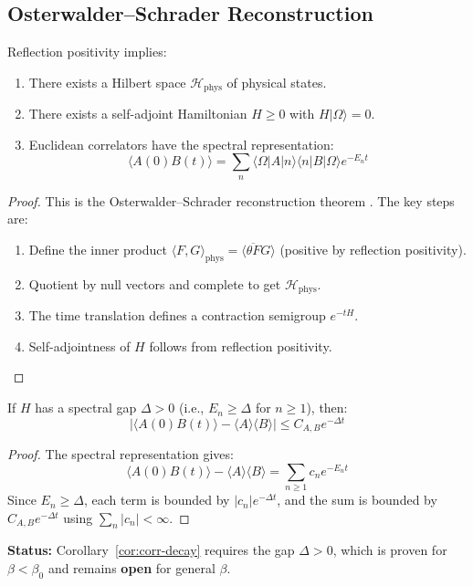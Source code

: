 \subsection{Osterwalder--Schrader Reconstruction}

\begin{theorem}[OS Reconstruction]
\label{thm:os-reconstruction}
Reflection positivity implies:
\begin{enumerate}[label=(\alph*)]
    \item There exists a Hilbert space $\mathcal{H}_{\mathrm{phys}}$ of physical states.
    \item There exists a self-adjoint Hamiltonian $H \geq 0$ with $H|\Omega\rangle = 0$.
    \item Euclidean correlators have the spectral representation:
    \[
    \langle A(0) B(t) \rangle = \sum_n \langle\Omega|A|n\rangle\langle n|B|\Omega\rangle e^{-E_n t}
    \]
\end{enumerate}
\end{theorem}

\begin{proof}
This is the Osterwalder--Schrader reconstruction theorem \cite{OS1973,OS1975}. 
The key steps are:
\begin{enumerate}
    \item Define the inner product $\langle F, G \rangle_{\mathrm{phys}} = \langle \overline{\theta F} G \rangle$ 
    (positive by reflection positivity).
    \item Quotient by null vectors and complete to get $\mathcal{H}_{\mathrm{phys}}$.
    \item The time translation defines a contraction semigroup $e^{-tH}$.
    \item Self-adjointness of $H$ follows from reflection positivity.
\end{enumerate}
\end{proof}

\begin{corollary}
\label{cor:corr-decay}
If $H$ has a spectral gap $\Delta > 0$ (i.e., $E_n \geq \Delta$ for $n \geq 1$), then:
\[
|\langle A(0) B(t) \rangle - \langle A \rangle \langle B \rangle| \leq C_{A,B} e^{-\Delta t}
\]
\end{corollary}

\begin{proof}
The spectral representation gives:
\[
\langle A(0) B(t) \rangle - \langle A \rangle \langle B \rangle = \sum_{n \geq 1} c_n e^{-E_n t}
\]
Since $E_n \geq \Delta$, each term is bounded by $|c_n| e^{-\Delta t}$, and the 
sum is bounded by $C_{A,B} e^{-\Delta t}$ using $\sum_n |c_n| < \infty$.
\end{proof}

\textbf{Status:} Corollary~\ref{cor:corr-decay} requires the gap $\Delta > 0$, which 
is proven for $\beta < \beta_0$ and remains \textbf{open} for general $\beta$.


